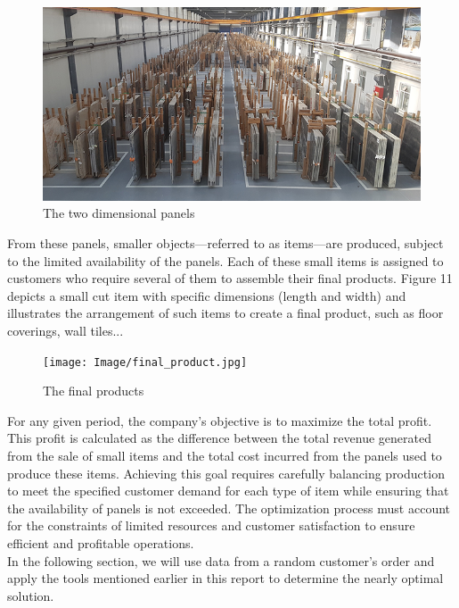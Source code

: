 \documentclass[a4paper]{article}
\begin{document}
    \begin{figure}[h]
        \centering
        \includegraphics[scale = 0.6]{Image/2D_panels.jpg}
        \caption{The two dimensional panels}
    \end{figure}
    \noindent
    From these panels, smaller objects—referred to as items—are produced, subject to the limited availability of the panels. Each of these small items is assigned to customers who require several of them to assemble their final products. Figure 11 depicts a small cut item with specific dimensions (length and width) and illustrates the arrangement of such items to create a final product, such as floor coverings, wall tiles...

    \begin{figure}[h]
        \centering
        \texttt{[image: Image/final\_product.jpg]}
        \caption{The final products}
    \end{figure}
    \vspace{0.2cm} \noindent
    For any given period, the company’s objective is to maximize the total profit. This profit is calculated as the difference between the total revenue generated from the sale of small items and the total cost incurred from the panels used to produce these items. Achieving this goal requires carefully balancing production to meet the specified customer demand for each type of item while ensuring that the availability of panels is not exceeded. The optimization process must account for the constraints of limited resources and customer satisfaction to ensure efficient and profitable operations.
    \vspace{0.2cm}\\
    In the following section, we will use data from a random customer’s order and apply the tools mentioned earlier in this report to determine the nearly optimal solution.
    \pagebreak
\end{document}
